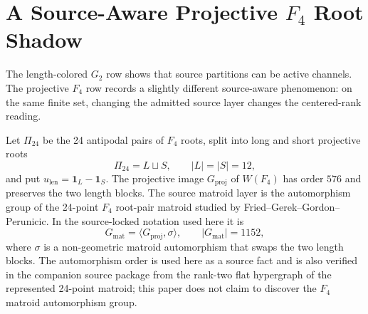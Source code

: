 \section{A Source-Aware Projective \texorpdfstring{\(F_4\)}{F4} Root Shadow}
\label{sec:f4-source-layer}

The length-colored \(G_2\) row shows that source partitions can be active channels.  The projective \(F_4\) row records a slightly different source-aware phenomenon: on the same finite set, changing the admitted source layer changes the centered-rank reading.

Let \(\Pi_{24}\) be the 24 antipodal pairs of \(F_4\) roots, split into long and short projective roots
\[
  \Pi_{24}=L\sqcup S,\qquad |L|=|S|=12,
\]
and put \(u_{\mathrm{len}}=\mathbf 1_L-\mathbf 1_S\).  The projective image \(G_{\mathrm{proj}}\) of \(W(F_4)\) has order \(576\) and preserves the two length blocks.  The source matroid layer is the automorphism group of the 24-point \(F_4\) root-pair matroid studied by Fried--Gerek--Gordon--Perunicic\cite{FriedGerekGordonPerunicic2007F4Matroid}.  In the source-locked notation used here it is
\[
  G_{\mathrm{mat}}=\langle G_{\mathrm{proj}},\sigma\rangle,
  \qquad |G_{\mathrm{mat}}|=1152,
\]
where \(\sigma\) is a non-geometric matroid automorphism that swaps the two length blocks.  The automorphism order is used here as a source fact and is also verified in the companion source package from the rank-two flat hypergraph of the represented 24-point matroid; this paper does not claim to discover the \(F_4\) matroid automorphism group.


